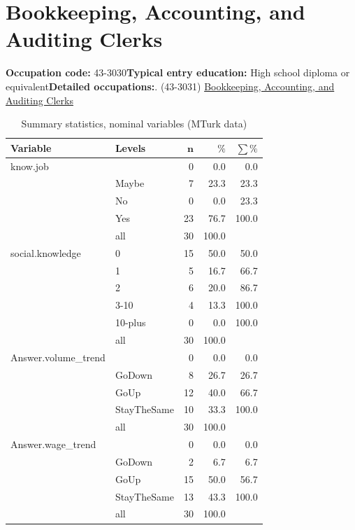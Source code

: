 \documentclass[a4paper,10pt]{article}\usepackage[]{graphicx}\usepackage[]{color}
\begin{document}
\newpage\section{Bookkeeping, Accounting, and Auditing Clerks}\textbf{Occupation code:} 43-3030\newline\textbf{Typical entry education:} High school diploma or equivalent\newline\textbf{Detailed occupations:}. (43-3031)  \href{http://www.bls.gov/oes/current/oes433031.htm}{Bookkeeping, Accounting, and Auditing Clerks}\newline%
\begin{table}[ht]
\centering
{\footnotesize
\begin{tabular}{ll|rrr}
 \textbf{Variable} & \textbf{Levels} & $\mathbf{n}$ & $\mathbf{\%}$ & $\mathbf{\sum \%}$ \\ 
  \hline
know.job &  & 0 & 0.0 & 0.0 \\ 
   & Maybe & 7 & 23.3 & 23.3 \\ 
   & No & 0 & 0.0 & 23.3 \\ 
   & Yes & 23 & 76.7 & 100.0 \\ 
   \hline
 & all & 30 & 100.0 &  \\ 
   \hline
\hline
social.knowledge & 0 & 15 & 50.0 & 50.0 \\ 
   & 1 & 5 & 16.7 & 66.7 \\ 
   & 2 & 6 & 20.0 & 86.7 \\ 
   & 3-10 & 4 & 13.3 & 100.0 \\ 
   & 10-plus & 0 & 0.0 & 100.0 \\ 
   \hline
 & all & 30 & 100.0 &  \\ 
   \hline
\hline
Answer.volume\_trend &  & 0 & 0.0 & 0.0 \\ 
   & GoDown & 8 & 26.7 & 26.7 \\ 
   & GoUp & 12 & 40.0 & 66.7 \\ 
   & StayTheSame & 10 & 33.3 & 100.0 \\ 
   \hline
 & all & 30 & 100.0 &  \\ 
   \hline
\hline
Answer.wage\_trend &  & 0 & 0.0 & 0.0 \\ 
   & GoDown & 2 & 6.7 & 6.7 \\ 
   & GoUp & 15 & 50.0 & 56.7 \\ 
   & StayTheSame & 13 & 43.3 & 100.0 \\ 
   \hline
 & all & 30 & 100.0 &  \\ 
   \hline
\hline
\end{tabular}
}
\caption{Summary statistics, nominal variables (MTurk data)} 
\label{tab1:43-3030}
\end{table}
\end{document}

